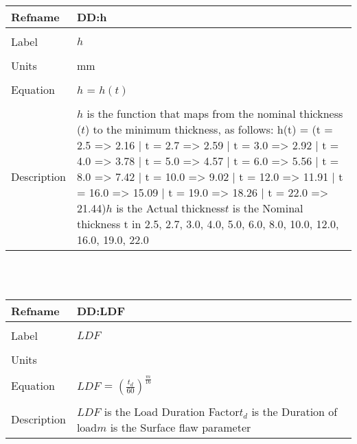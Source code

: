 \documentclass[12pt]{article}
\begin{document}
\noindent \begin{minipage}{\textwidth}
\begin{tabular}{p{} p{}}
\toprule \textbf{Refname} & \textbf{DD:h}
\label{DD:h}
\\ \midrule \\
Label & $h$
\\ \midrule \\
Units & mm
\\ \midrule \\
Equation & $h$ = $h(t)$
\\ \midrule \\
Description & $h$ is the  function that maps from the nominal thickness ($t$) to the minimum thickness, as follows: h(t) = (t = 2.5 => 2.16 | t = 2.7 => 2.59 | t = 3.0 => 2.92 | t = 4.0 => 3.78 | t = 5.0 => 4.57 | t = 6.0 => 5.56 | t = 8.0 => 7.42 | t = 10.0 => 9.02 | t = 12.0 => 11.91 | t = 16.0 => 15.09 | t = 19.0 => 18.26 | t = 22.0 => 21.44)\newline$h$ is the Actual thickness\newline$t$ is the Nominal thickness t in {2.5, 2.7, 3.0, 4.0, 5.0, 6.0, 8.0, 10.0, 12.0, 16.0, 19.0, 22.0}
\\ \bottomrule \end{tabular}
\end{minipage}\\
~\newline
\noindent \begin{minipage}{\textwidth}
\begin{tabular}{p{} p{}}
\toprule \textbf{Refname} & \textbf{DD:LDF}
\label{DD:LDF}
\\ \midrule \\
Label & $LDF$
\\ \midrule \\
Units & 
\\ \midrule \\
Equation & $LDF$ = $(\frac{t_{d}}{60})^{\frac{m}{16}}$
\\ \midrule \\
Description & $LDF$ is the Load Duration Factor\newline$t_{d}$ is the Duration of load\newline$m$ is the Surface flaw parameter
\\ \bottomrule \end{tabular}
\end{minipage}\\
\end{document}
